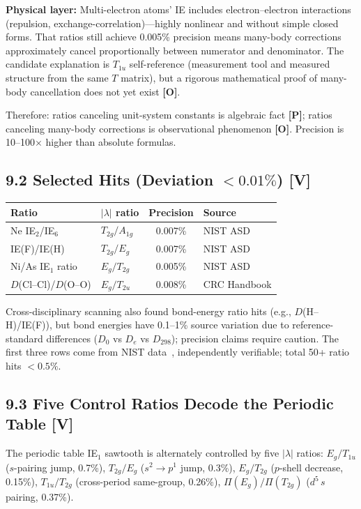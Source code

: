 \documentclass[11pt,a4paper]{article}
\newcommand{\gradeP}{\textbf{[P]}}
\newcommand{\gradeV}{\textbf{[V]}}
\newcommand{\gradeO}{\textbf{[O]}}
\begin{document}
\textbf{Physical layer:} Multi-electron atoms' IE includes electron--electron interactions (repulsion, exchange-correlation)---highly nonlinear and without simple closed forms. That ratios still achieve 0.005\% precision means many-body corrections approximately cancel proportionally between numerator and denominator. The candidate explanation is $T_{1u}$ self-reference (measurement tool and measured structure from the same $T$ matrix), but a rigorous mathematical proof of many-body cancellation does not yet exist \gradeO.

Therefore: ratios canceling unit-system constants is algebraic fact \gradeP; ratios canceling many-body corrections is observational phenomenon \gradeO. Precision is 10--100$\times$ higher than absolute formulas.

\subsection{9.2 Selected Hits (Deviation $<0.01\%$) \gradeV}

\begin{center}
\begin{tabular}{llcl}
\toprule
Ratio & $|\lambda|$ ratio & Precision & Source \\
\midrule
Ne IE$_2$/IE$_6$ & $T_{2g}/A_{1g}$ & 0.007\% & NIST ASD \\
IE(F)/IE(H) & $T_{2g}/E_g$ & 0.007\% & NIST ASD \\
Ni/As IE$_1$ ratio & $E_g/T_{2g}$ & 0.005\% & NIST ASD \\
$D$(Cl--Cl)/$D$(O--O) & $E_g/T_{2u}$ & 0.008\% & CRC Handbook \\
\bottomrule
\end{tabular}
\end{center}

Cross-disciplinary scanning also found bond-energy ratio hits (e.g., $D$(H--H)/IE(F)), but bond energies have 0.1--1\% source variation due to reference-standard differences ($D_0$ vs $D_e$ vs $D_{298}$); precision claims require caution. The first three rows come from NIST data~\cite{nist}, independently verifiable; total 50+ ratio hits $<0.5\%$.

\subsection{9.3 Five Control Ratios Decode the Periodic Table \gradeV}

The periodic table IE$_1$ sawtooth is alternately controlled by five $|\lambda|$ ratios: $E_g/T_{1u}$ ($s$-pairing jump, 0.7\%), $T_{2g}/E_g$ ($s^2\to p^1$ jump, 0.3\%), $E_g/T_{2g}$ ($p$-shell decrease, 0.15\%), $T_{1u}/T_{2g}$ (cross-period same-group, 0.26\%), $\Pi(E_g)/\Pi(T_{2g})$ ($d^5\,s$ pairing, 0.37\%).
\end{document}
